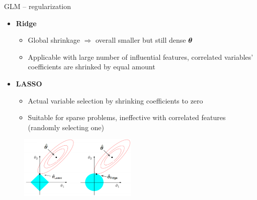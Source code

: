 \begin{frame2}{GLM -- regularization}





\begin{itemize}
  \item \textbf{Ridge}
  \begin{itemize} 
    \item Global shrinkage $\Rightarrow$ overall smaller but still dense $\bm{\theta}$
    \item Applicable with large number of influential features,
    correlated variables' coefficients are shrinked by equal amount
  \end{itemize}
  \item \textbf{LASSO}
  \begin{itemize} 
    \item Actual variable selection by shrinking coefficients to zero
    \item Suitable for sparse problems, ineffective with correlated 
    features (randomly selecting one)
  \end{itemize}  
\end{itemize}

\begin{figure}
    \centering
    \includegraphics[width=0.5\textwidth]{figure/l1_l2_hat.png}
\end{figure}

\end{frame2}


